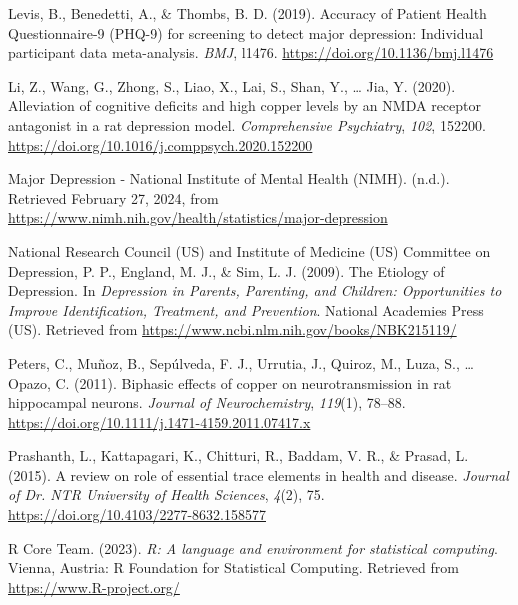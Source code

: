 \documentclass[
  man]{apa6}
\newlength{\cslhangindent}
\newlength{\cslentryspacingunit} %
\newenvironment{CSLReferences}[2] %
 {%
  \setlength{\parindent}{0pt}
  \ifodd #1
  \let\oldpar\par
  \def\par{\hangindent=\cslhangindent\oldpar}
  \fi
  \setlength{\parskip}{#2\cslentryspacingunit}
 }%
 {}
\begin{document}
\begin{CSLReferences}{1}{0}
\leavevmode{}%
Levis, B., Benedetti, A., \& Thombs, B. D. (2019). Accuracy of {Patient Health Questionnaire-9} ({PHQ-9}) for screening to detect major depression: Individual participant data meta-analysis. \emph{BMJ}, l1476. \url{https://doi.org/10.1136/bmj.l1476}

\leavevmode{}%
Li, Z., Wang, G., Zhong, S., Liao, X., Lai, S., Shan, Y., \ldots{} Jia, Y. (2020). Alleviation of cognitive deficits and high copper levels by an {NMDA} receptor antagonist in a rat depression model. \emph{Comprehensive Psychiatry}, \emph{102}, 152200. \url{https://doi.org/10.1016/j.comppsych.2020.152200}

\leavevmode{}%
Major {Depression} - {National Institute} of {Mental Health} ({NIMH}). (n.d.). Retrieved February 27, 2024, from \url{https://www.nimh.nih.gov/health/statistics/major-depression}

\leavevmode{}%
National Research Council (US) and Institute of Medicine (US) Committee on Depression, P. P., England, M. J., \& Sim, L. J. (2009). The {Etiology} of {Depression}. In \emph{Depression in {Parents}, {Parenting}, and {Children}: {Opportunities} to {Improve Identification}, {Treatment}, and {Prevention}}. {National Academies Press (US)}. Retrieved from \url{https://www.ncbi.nlm.nih.gov/books/NBK215119/}

\leavevmode{}%
Peters, C., Muñoz, B., Sepúlveda, F. J., Urrutia, J., Quiroz, M., Luza, S., \ldots{} Opazo, C. (2011). Biphasic effects of copper on neurotransmission in rat hippocampal neurons. \emph{Journal of Neurochemistry}, \emph{119}(1), 78--88. \url{https://doi.org/10.1111/j.1471-4159.2011.07417.x}

\leavevmode{}%
Prashanth, L., Kattapagari, K., Chitturi, R., Baddam, V. R., \& Prasad, L. (2015). A review on role of essential trace elements in health and disease. \emph{Journal of Dr. NTR University of Health Sciences}, \emph{4}(2), 75. \url{https://doi.org/10.4103/2277-8632.158577}

\leavevmode{}%
R Core Team. (2023). \emph{R: A language and environment for statistical computing}. Vienna, Austria: R Foundation for Statistical Computing. Retrieved from \url{https://www.R-project.org/}


\end{CSLReferences}
\end{document}

